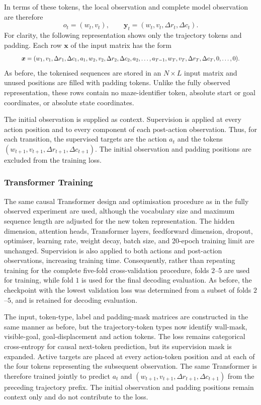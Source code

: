﻿\documentclass[12pt,a4paper]{article}
\theoremstyle{definition}
\begin{document}
In terms of these tokens, the local observation and complete model observation are
therefore
\begin{equation}
o_t=(w_t,v_t),
\qquad
\mathbf{y}_t=(w_t,v_t,\Delta r_t,\Delta c_t).
\end{equation}
For clarity, the following representation shows only the trajectory tokens and padding.
Each row $\boldsymbol{x}$ of the input matrix has the form
\begin{equation}
\resizebox{0.9\textwidth}{!}{$\displaystyle
\boldsymbol{x}=(w_1,v_1,\Delta r_1,\Delta c_1,a_1,
w_2,v_2,\Delta r_2,\Delta c_2,a_2,\dots,
a_{T-1},w_T,v_T,\Delta r_T,\Delta c_T,0,\dots,0).
$}
\end{equation}
As before, the tokenised sequences are stored in an $N\times L$ input matrix and unused
positions are filled with padding tokens. Unlike the fully observed representation, these
rows contain no maze-identifier token, absolute start or goal coordinates, or absolute
state coordinates.

The initial observation is supplied as context. Supervision is applied at every action
position and to every component of each post-action observation. Thus, for
each transition, the supervised targets are the action $a_t$ and the tokens
$(w_{t+1},v_{t+1},\Delta r_{t+1},\Delta c_{t+1})$. The initial observation and padding
positions are excluded from the training loss.

\subsubsection{Transformer Training}

The same causal Transformer design and optimisation procedure as in the fully observed
experiment are used, although the vocabulary size and maximum sequence length are adjusted
for the new token representation. The hidden dimension, attention heads, Transformer
layers, feedforward dimension, dropout, optimiser, learning rate, weight decay, batch size,
and 20-epoch training limit are unchanged. Supervision is also applied to both actions and post-action
observations, increasing training time. Consequently, rather than repeating training for the complete five-fold
cross-validation procedure, folds $2$--$5$ are used for training, while fold $1$ is used
for the final decoding evaluation. As
before, the checkpoint with the lowest validation loss was determined from a subset of folds $2$--$5$, and is retained for decoding evaluation.

The input, token-type, label and padding-mask matrices are constructed in the same manner
as before, but the trajectory-token types now identify wall-mask, visible-goal,
goal-displacement and action tokens. The loss remains categorical cross-entropy for causal
next-token prediction, but its supervision mask is expanded. Active targets are placed at
every action-token position and at each of the four tokens representing the subsequent
observation. The same Transformer is therefore trained jointly to predict
$a_t$ and $(w_{t+1},v_{t+1},\Delta r_{t+1},\Delta c_{t+1})$ from the preceding trajectory
prefix. The initial observation and padding positions remain context only and do not
contribute to the loss.
\end{document}
